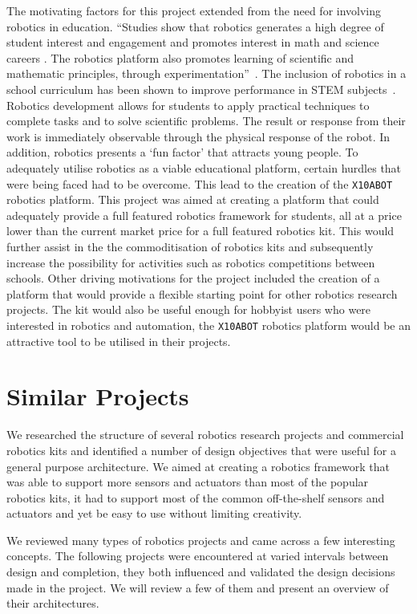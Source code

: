The motivating factors for this project extended from the need for involving
robotics in education. ``Studies show that robotics generates a high
degree of student interest and engagement and promotes interest in math and 
science careers .  The robotics platform also promotes learning of scientific 
and mathematic principles, through experimentation''~\parencite{barker}.
The  inclusion of robotics in a school curriculum has been
shown to improve performance in STEM subjects~\parencite{school}. 
Robotics development allows for students to apply practical techniques to complete tasks and 
to solve scientific problems. The result or response from their work is
immediately observable through the physical response of the robot. In addition,
robotics  presents a `fun factor' that attracts young people.
To adequately utilise robotics as a viable educational platform, certain hurdles 
that were being faced had to be overcome. This lead to the creation of the \texttt{X10ABOT} robotics
platform. This project was aimed at creating a platform that could 
adequately provide a full featured robotics framework for students, all at a
price lower than the current market price for a full featured robotics kit.
This would further assist in the the commoditisation of robotics kits and subsequently
increase the possibility for activities such as robotics competitions between schools.
Other driving motivations for the project included the creation of a platform that
would provide a flexible starting point for other robotics research projects. The kit
would also be useful enough for hobbyist users who were interested in robotics
and automation, the \texttt{X10ABOT} robotics platform would be an attractive tool to be utilised in their projects.

\section{Similar Projects} %
\label{sec:similar}
We researched the structure of several robotics research projects and commercial robotics kits and identified a number of design objectives that were useful for a general purpose architecture. We aimed at creating a robotics framework that was able to support more sensors and actuators than most of the popular robotics kits, it had to support most of the common off-the-shelf sensors and actuators and yet be easy to use without limiting creativity. 

We reviewed many types of robotics projects and came across a few interesting concepts. The following projects were encountered at varied intervals between design and completion, they both influenced and validated the design decisions made in the \xten project. We will review a few of them and present an overview of their architectures. 

